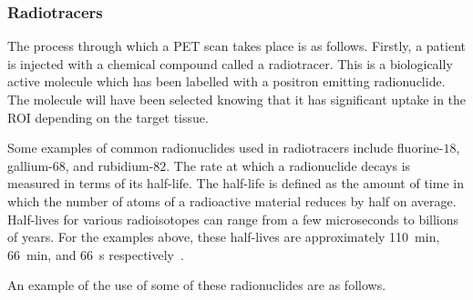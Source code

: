             \subsubsection{Radiotracers} \label{sec:radiotracers}
                The process through which a \gls{PET} scan takes place is as follows. Firstly, a patient is injected with a chemical compound called a radiotracer. This is a biologically active molecule which has been labelled with a positron emitting radionuclide. The molecule will have been selected knowing that it has significant uptake in the \gls{ROI} depending on the target tissue. %
                
                Some examples of common radionuclides used in radiotracers include fluorine-$18$, gallium-$68$, and rubidium-$82$. %
                The rate at which a radionuclide decays is measured in terms of its half-life. The half-life is defined as the amount of time in which the number of atoms of a radioactive material reduces by half on average. Half-lives for various radioisotopes can range from a few microseconds to billions of years. For the examples above, these half-lives are approximately \SI{110}{\minute}, \SI{66}{\minute}, and \SI{66}{\second} respectively~\parencite{FDGGuidelines}. %
                
                An example of the use of some of these radionuclides are as follows.
                
